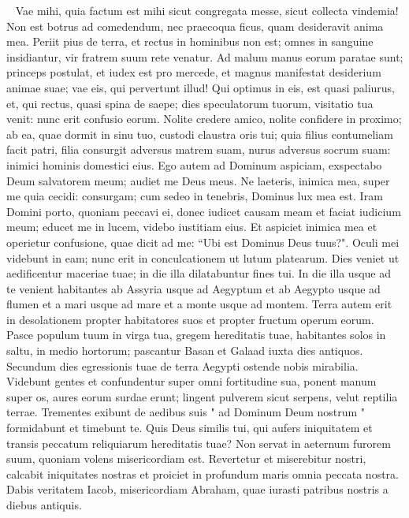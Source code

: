 \begin{biblechapter}   
\verse Vae mihi, quia factum est mihi sicut congregata messe, sicut collecta vindemia! Non est botrus ad comedendum, nec praecoqua ficus, quam desideravit anima mea. 
\verse Periit pius de terra, et rectus in hominibus non est; omnes in sanguine insidiantur, vir fratrem suum rete venatur. 
\verse Ad malum manus eorum paratae sunt; princeps postulat, et iudex est pro mercede, et magnus manifestat desiderium animae suae; vae eis, qui pervertunt illud! 
\verse Qui optimus in eis, est quasi paliurus, et, qui rectus, quasi spina de saepe; dies speculatorum tuorum, visitatio tua venit: nunc erit confusio eorum. 
\verse Nolite credere amico, nolite confidere in proximo; ab ea, quae dormit in sinu tuo, custodi claustra oris tui; 
\verse quia filius contumeliam facit patri, filia consurgit adversus matrem suam, nurus adversus socrum suam: inimici hominis domestici eius. 
\verse Ego autem ad Dominum aspiciam, exspectabo Deum salvatorem meum; audiet me Deus meus. 
\verse Ne laeteris, inimica mea, super me quia cecidi: consurgam; cum sedeo in tenebris, Dominus lux mea est. 
\verse Iram Domini porto, quoniam peccavi ei, donec iudicet causam meam et faciat iudicium meum; educet me in lucem, videbo iustitiam eius. 
\verse Et aspiciet inimica mea et operietur confusione, quae dicit ad me: “Ubi est Dominus Deus tuus?". Oculi mei videbunt in eam; nunc erit in conculcationem ut lutum platearum. 
\verse Dies veniet ut aedificentur maceriae tuae; in die illa dilatabuntur fines tui. 
\verse In die illa usque ad te venient habitantes ab Assyria usque ad Aegyptum et ab Aegypto usque ad flumen et a mari usque ad mare et a monte usque ad montem. 
\verse Terra autem erit in desolationem propter habitatores suos et propter fructum operum eorum. 
\verse Pasce populum tuum in virga tua, gregem hereditatis tuae, habitantes solos in saltu, in medio hortorum; pascantur Basan et Galaad iuxta dies antiquos. 
\verse Secundum dies egressionis tuae de terra Aegypti ostende nobis mirabilia. 
\verse Videbunt gentes et confundentur super omni fortitudine sua, ponent manum super os, aures eorum surdae erunt; 
\verse lingent pulverem sicut serpens, velut reptilia terrae. Trementes exibunt de aedibus suis " ad Dominum Deum nostrum " formidabunt et timebunt te. 
\verse Quis Deus similis tui, qui aufers iniquitatem et transis peccatum reliquiarum hereditatis tuae? Non servat in aeternum furorem suum, quoniam volens misericordiam est. 
\verse Revertetur et miserebitur nostri, calcabit iniquitates nostras et proiciet in profundum maris omnia peccata nostra. 
\verse Dabis veritatem Iacob, misericordiam Abraham, quae iurasti patribus nostris a diebus antiquis.     
\end{biblechapter}
